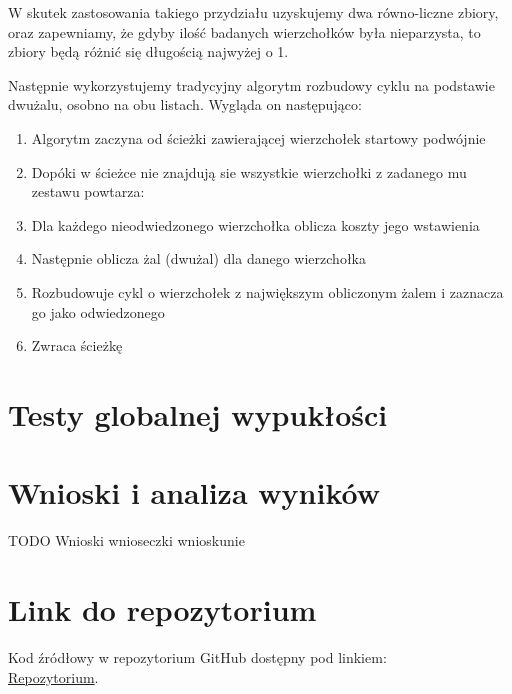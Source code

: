 \documentclass[11pt]{article}
\begin{document}
W skutek zastosowania takiego przydziału uzyskujemy dwa równo-liczne zbiory, oraz zapewniamy, że gdyby ilość badanych wierzchołków była nieparzysta, to zbiory będą różnić się długością najwyżej o 1.

Następnie wykorzystujemy tradycyjny algorytm rozbudowy cyklu na podstawie dwużalu, osobno na obu listach.
Wygląda on następująco:

\begin{enumerate}
    \item Algorytm zaczyna od ścieżki zawierającej wierzchołek startowy podwójnie
    \item Dopóki w ścieżce nie znajdują sie wszystkie wierzchołki z zadanego mu zestawu powtarza:
    \item Dla każdego nieodwiedzonego wierzchołka oblicza koszty jego wstawienia
    \item Następnie oblicza żal (dwużal) dla danego wierzchołka
    \item Rozbudowuje cykl o wierzchołek z największym obliczonym żalem i zaznacza go jako odwiedzonego
    \item Zwraca ścieżkę
\end{enumerate}

\section{Testy globalnej wypukłości}\label{sec:testy-globalnej-wypukosci}


\section{Wnioski i analiza wyników}\label{sec:wnioski}

TODO
Wnioski wnioseczki wnioskunie


\section{Link do repozytorium}\label{sec:link-do-repo}
Kod źródłowy w repozytorium GitHub dostępny pod linkiem: \\
\href{https://github.com/KotZPolibudy/PUT_IMO}{Repozytorium}.
\end{document}
